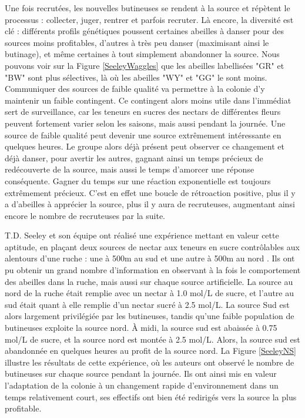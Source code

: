 			Une fois recrutées, les nouvelles butineuses se rendent à la source et répètent le processus : collecter, juger, rentrer et parfois recruter. Là encore, la diversité est clé : différents profils génétiques poussent certaines abeilles à danser pour des sources moins profitables, d'autres à très peu danser (maximisant ainsi le butinage), et même certaines à tout simplement abandonner la source. Nous pouvons voir sur la Figure \ref{SeeleyWaggles} que les abeilles labellisées "GR" et "BW" sont plus sélectives, là où les abeilles "WY" et "GG" le sont moins. Communiquer des sources de faible qualité va permettre à la colonie d'y maintenir un faible contingent. Ce contingent alors moins utile dans l'immédiat sert de surveillance, car les teneurs en sucres des nectars de différentes fleurs peuvent fortement varier selon les saisons, mais aussi pendant la journée. 
			Une source de faible qualité peut devenir une source extrêmement intéressante en quelques heures. Le groupe alors déjà présent peut observer ce changement et déjà danser, pour avertir les autres, gagnant ainsi un temps précieux de redécouverte de la source, mais aussi le temps d'amorcer une réponse conséquente. Gagner du temps sur une réaction exponentielle est toujours extrêmement précieux. 
			C'est en effet une boucle de rétroaction positive, plus il y a d'abeilles à apprécier la source, plus il y aura de recruteuses, augmentant ainsi encore le nombre de recruteuses par la suite.
			
			 T.D. Seeley et son équipe ont réalisé une expérience mettant en valeur cette aptitude, en plaçant deux sources de nectar aux teneurs en sucre contrôlables aux alentours d'une ruche : une à 500m au sud et une autre à 500m au nord \cite{seeley_collective_1991}. Ils ont pu obtenir un grand nombre d'information en observant à la fois le comportement des abeilles dans la ruche, mais aussi sur chaque source artificielle. La source au nord de la ruche était remplie avec un nectar à 1.0 mol/L de sucre, et l'autre au sud était quant à elle remplie d'un nectar sucré à 2.5 mol/L. 
			La source Sud est alors largement privilégiée par les butineuses, tandis qu'une faible population de butineuses exploite la source nord. À midi, la source sud est abaissée à 0.75 mol/L de sucre, et la source nord est montée à 2.5 mol/L. Alors, la source sud est abandonnée en quelques heures au profit de la source nord. La Figure \ref{SeeleyNS} illustre les résultats de cette expérience, où les auteurs ont observé le nombre de butineuses sur chaque source pendant la journée. Ils ont ainsi mis en valeur l'adaptation de la colonie à un changement rapide d'environnement dans un temps relativement court, ses effectifs ont bien été redirigés vers la source la plus profitable.
			
